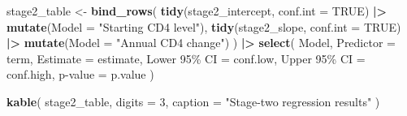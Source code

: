 \documentclass[
]{article}
\newenvironment{Shaded}{\begin{snugshade}}{\end{snugshade}}
\newcommand{\AttributeTok}[1]{\textcolor[rgb]{0.13,0.29,0.53}{#1}}
\newcommand{\ConstantTok}[1]{\textcolor[rgb]{0.56,0.35,0.01}{#1}}
\newcommand{\DecValTok}[1]{\textcolor[rgb]{0.00,0.00,0.81}{#1}}
\newcommand{\FunctionTok}[1]{\textcolor[rgb]{0.13,0.29,0.53}{\textbf{#1}}}
\newcommand{\NormalTok}[1]{#1}
\newcommand{\OtherTok}[1]{\textcolor[rgb]{0.56,0.35,0.01}{#1}}
\newcommand{\SpecialCharTok}[1]{\textcolor[rgb]{0.81,0.36,0.00}{\textbf{#1}}}
\newcommand{\StringTok}[1]{\textcolor[rgb]{0.31,0.60,0.02}{#1}}
\begin{document}
\begin{Shaded}
\begin{Highlighting}[]
\NormalTok{stage2\_table }\OtherTok{\textless{}{-}} \FunctionTok{bind\_rows}\NormalTok{(}
  \FunctionTok{tidy}\NormalTok{(stage2\_intercept, }\AttributeTok{conf.int =} \ConstantTok{TRUE}\NormalTok{) }\SpecialCharTok{|\textgreater{}}
    \FunctionTok{mutate}\NormalTok{(}\AttributeTok{Model =} \StringTok{"Starting CD4 level"}\NormalTok{),}
  \FunctionTok{tidy}\NormalTok{(stage2\_slope, }\AttributeTok{conf.int =} \ConstantTok{TRUE}\NormalTok{) }\SpecialCharTok{|\textgreater{}}
    \FunctionTok{mutate}\NormalTok{(}\AttributeTok{Model =} \StringTok{"Annual CD4 change"}\NormalTok{)}
\NormalTok{) }\SpecialCharTok{|\textgreater{}}
  \FunctionTok{select}\NormalTok{(}
\NormalTok{    Model,}
    \AttributeTok{Predictor =}\NormalTok{ term,}
    \AttributeTok{Estimate =}\NormalTok{ estimate,}
    \StringTok{\textasciigrave{}}\AttributeTok{Lower 95\% CI}\StringTok{\textasciigrave{}} \OtherTok{=}\NormalTok{ conf.low,}
    \StringTok{\textasciigrave{}}\AttributeTok{Upper 95\% CI}\StringTok{\textasciigrave{}} \OtherTok{=}\NormalTok{ conf.high,}
    \StringTok{\textasciigrave{}}\AttributeTok{p{-}value}\StringTok{\textasciigrave{}} \OtherTok{=}\NormalTok{ p.value}
\NormalTok{  )}

\FunctionTok{kable}\NormalTok{(}
\NormalTok{  stage2\_table,}
  \AttributeTok{digits =} \DecValTok{3}\NormalTok{,}
  \AttributeTok{caption =} \StringTok{"Stage{-}two regression results"}
\NormalTok{)}
\end{Highlighting}
\end{Shaded}
\end{document}
